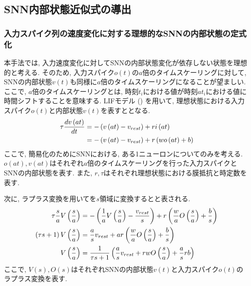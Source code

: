 \subsection{SNN内部状態近似式の導出}

\subsubsection{入力スパイク列の速度変化に対する理想的なSNNの内部状態の定式化}
本手法では, 入力速度変化に対してSNNの内部状態変化が依存しない状態を理想的と考える.
そのため, 入力スパイク$o(t)$の$a$倍のタイムスケーリングに対して, SNNの内部状態$v(t)$も同様に$a$倍のタイムスケーリングになることが望ましい.
ここで, $a$倍のタイムスケーリングとは, 時刻$t_i$における値が時刻$at_i$における値に時間シフトすることを意味する.
LIFモデル () を用いて, 理想状態における入力スパイク$o(t)$と内部状態$v(t)$を表すととなる.
\begin{align}
    \tau \frac{dv\left(at\right)}{dt} &= -\left(v\left(at\right) - v_{rest}\right) + r i\left(at\right) \notag \\
     &= -\left(v\left(at\right) - v_{rest}\right) + r \left( wo\left(at\right) + b \right) \label{eq:ideal:state}
\end{align}
ここで, 簡易化のためにSNNにおける, ある1ニューロンについてのみを考える.
$o(at), v(at)$はそれぞれ$a$倍のタイムスケーリングを行った入力スパイクとSNNの内部状態を表す.
また, $r, \tau$はそれぞれ理想状態における膜抵抗と時定数を表す.

次に, ラプラス変換を用いてを$s$領域に変換するとと表される.
\begin{align}
    \tau \frac{s}{a} V\left(\frac{s}{a}\right) &= -\left(\frac{1}{a} V\left(\frac{s}{a}\right) 
    - \frac{v_{rest}}{s}\right) + r \left( \frac{w}{a} O\left(\frac{s}{a}\right) + \frac{b}{s} \right) \notag \\
    \left(\tau s +1\right) V\left(\frac{s}{a}\right)  &= \frac{a}{s} v_{rest} +ar \left( \frac{w}{a} O\left(\frac{s}{a}\right) + \frac{b}{s} \right) \notag \\
    V\left(\frac{s}{a}\right) &=  \frac{1}{\tau s +1}\left( \frac{a}{s} v_{rest} +rw O\left(\frac{s}{a}\right) + \frac{a}{s}rb \right) \label{eq:ideal:state:laplace}
\end{align}
ここで, $V(s), O(s)$はそれぞれSNNの内部状態$v(t)$と入力スパイク$o(t)$のラプラス変換を表す.


